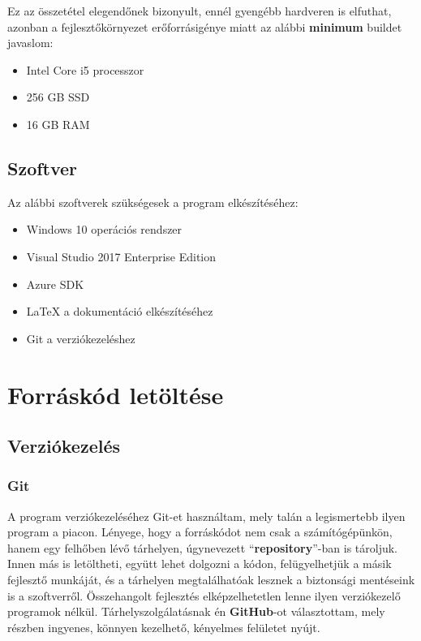 \documentclass[a4paper,12pt]{report}
\begin{document}
    Ez az összetétel elegendőnek bizonyult, ennél gyengébb hardveren is elfuthat, azonban a fejlesztőkörnyezet erőforrásigénye
    miatt az alábbi \textbf{minimum} buildet javaslom:

\begin{itemize}
    \item Intel Core i5 processzor
    \item 256 GB SSD
    \item 16 GB RAM
\end{itemize}

\subsection{Szoftver}
    Az alábbi szoftverek szükségesek a program elkészítéséhez:

\begin{itemize}
    \item Windows 10 operációs rendszer
    \item Visual Studio 2017 Enterprise Edition
    \item Azure SDK
    \item LaTeX a dokumentáció elkészítéséhez
    \item Git a verziókezeléshez
\end{itemize}

\section{Forráskód letöltése}

\subsection{Verziókezelés}

\subsubsection{Git}
    A program verziókezeléséhez Git-et használtam, mely talán a legismertebb ilyen program a piacon. Lényege, hogy a forráskódot
    nem csak a számítógépünkön, hanem egy felhőben lévő tárhelyen, úgynevezett ``\textbf{repository}''-ban is tároljuk. Innen
    más is letöltheti, együtt lehet dolgozni a kódon, felügyelhetjük a másik fejlesztő munkáját, és a tárhelyen megtalálhatóak lesznek a
    biztonsági mentéseink is a szoftverről. Összehangolt fejlesztés elképzelhetetlen lenne ilyen verziókezelő programok nélkül.
    Tárhelyszolgálatásnak én \textbf{GitHub}-ot választottam, mely részben ingyenes, könnyen kezelhető, kényelmes felületet nyújt.
\end{document}

